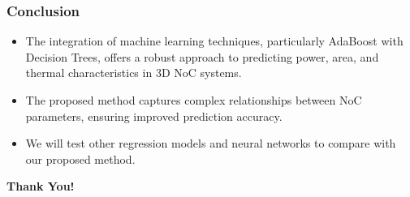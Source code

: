 \documentclass{beamer}
\begin{document}
\begin{frame}
\frametitle{Conclusion}

\begin{itemize}
    \item The integration of machine learning techniques, particularly AdaBoost with Decision Trees, offers a robust approach to predicting power, area, and thermal characteristics in 3D NoC systems.
    \item The proposed method captures complex relationships between NoC parameters, ensuring improved prediction accuracy.
    \item We will test other regression models and neural networks to compare with our proposed method.

\end{itemize}

\end{frame}


\begin{frame}
\centering
\Huge
\textbf{Thank You!}

\vspace{2cm}
\end{frame}
\end{document}
